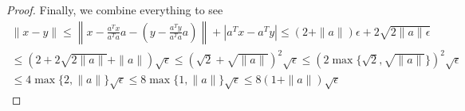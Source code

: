 \documentclass{article}
\theoremstyle{case}
\numberwithin{theorem}{subsection}
\begin{document}
\begin{proof}
% 



Finally, we combine everything to see
\begin{align*}
\|x - y\| 
\le \left\|x - \frac{a^Tx}{a^Ta} a - \left(y - \frac{a^Ty}{a^Ta} a\right)\right\| + |a^Tx - a^Ty|
\le (2 + \|a\|)\epsilon + 2\sqrt{2\|a\|\epsilon} \\
\le \left(2 + 2\sqrt{2\|a\|} + \|a\|\right)\sqrt{\epsilon}
\le \left(\sqrt{2} + \sqrt{\|a\|}\right)^2 \sqrt{\epsilon}
\le \left(2\max\{\sqrt{2},\sqrt{\|a\|}\}\right)^2 \sqrt{\epsilon} \\
\le 4\max\{2,\|a\|\} \sqrt{\epsilon}
\le 8\max\{1,\|a\|\} \sqrt{\epsilon}
\le 8(1 + \|a\|) \sqrt{\epsilon}
\end{align*}



\end{proof}
\end{document}
